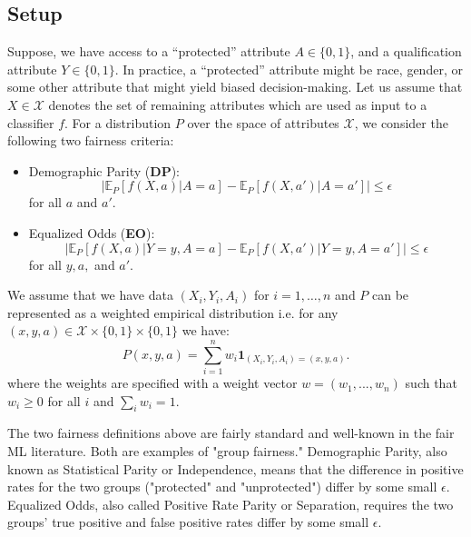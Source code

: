 \documentclass[11pt]{article}
\newcommand{\E}{\mathbb{E}}
\newcommand{\set}[1]{\{#1\}}
\newcommand{\abs}[1]{\left|#1\right|}
\newcommand{\Xc}{\mathcal{X}}
\newcommand{\eye}{\mathbf{1}}
\renewcommand{\cite}{\parencite}
\begin{document}
\subsection{Setup}
Suppose, we have access to a ``protected'' attribute $A \in \set{0,1}$, and a qualification attribute $Y \in \set{0,1}$. In practice, a ``protected'' attribute might be race, gender, or some other attribute that might yield biased decision-making. Let us assume that $X \in \Xc$ denotes the set of remaining attributes which are used as input to a classifier $f$. For a distribution $P$ over the space of attributes $\Xc$, we consider the following two fairness criteria:
\begin{itemize}
\item Demographic Parity ({\bfseries DP}):
$$\abs{\E_{P}[f(X,a)|A=a] - \E_P[f(X,a')|A=a']} \le \epsilon$$
for all $a$ and $a'$.
\item Equalized Odds ({\bfseries EO}):
$$\abs{\E_{P}[f(X,a)|Y=y, A=a] - \E_P[f(X,a')|Y=y, A=a']} \le \epsilon$$
for all $y,a,$ and $a'$.
\end{itemize}
We assume that we have data $(X_i,Y_i,A_i)$ for $i=1,\ldots,n$ and $P$
can be represented as a weighted empirical distribution i.e. for any $(x,y,a) \in \Xc \times \set{0,1} \times \set{0,1}$ we have:
$$ P(x,y,a) = \sum_{i=1}^n w_i \eye_{(X_i,Y_i,A_i)=(x,y,a)}.$$
where the weights are specified with a weight vector $w = (w_1, ..., w_n)$ such that $w_i \geq 0$ for all $i$ and $\sum_i w_i = 1.$ 

\par

The two fairness definitions above are fairly standard and well-known in the fair ML literature. Both are examples of "group fairness." Demographic Parity, also known as Statistical Parity or Independence, \cite{DBLP:journals/corr/abs-1104-3913} means that the difference in positive rates for the two groups ("protected" and "unprotected") differ by some small $\epsilon.$ Equalized Odds, also called Positive Rate Parity or Separation, requires the two groups' true positive and false positive rates differ by some small $\epsilon.$
\end{document}

